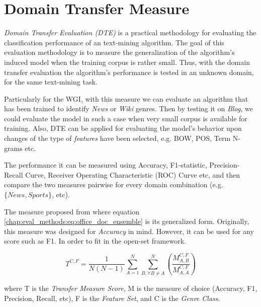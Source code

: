 \section{Domain Transfer Measure}\label{chap:eval_methods:sec:domain_transfer_measure}

\textit{Domain Transfer Evaluation (DTE)} is a practical methodology for evaluating the classification performance of an text-mining algorithm. The goal of this evaluation methodology is to measure the generalization of the algorithm's induced model when the training corpus is rather small. Thus, with the domain transfer evaluation the algorithm's performance is tested in an unknown domain, for the same text-mining task. 

Particularly for the WGI, with this measure we can evaluate an algorithm that has been trained to identify \textit{News} or \textit{Wiki} genres. Then by testing it on \textit{Blog}, we could evaluate the model in such a case when very small corpus is available for training. Also, DTE can be applied for evaluating the model's behavior upon changes of the type of \textit{features} have been selected, e.g. BOW, POS, Term N-grams etc. 

The performance it can be measured using Accuracy, F1-statistic, Precision-Recall Curve, Receiver Operating Characteristic (ROC) Curve etc, and then compare the two measures pairwise for every domain combination (e.g. $\{News, Sports\}$, etc).

The measure proposed from \parencite{finn2006learning} where equation \ref{chap:eval_methods:eq:office_doc_ensemble} is its generalized form. Originally, this measure was designed for \textit{Accuracy} in mind. However, it can be used for any score such as F1. In order to fit in the open-set framework.

\begin{equation} \label{chap:eval_methods:eq:office_doc_ensemble}
	T^{C,F} = \frac{1}{N(N-1)} \sum_{A=1}^{N} \sum_{B, \forall B \neq A}^{N} \left(  \frac{M^{C,F}_{A,B}}{M^{C,F}_{A,A}} \right)
\end{equation}

\noindent	
where T is the \textit{Transfer Measure Score}, M is the measure of choice (Accuracy, F1, Precision, Recall, etc), F is the \textit{Feature Set}, and C is the \textit{Genre Class}. 
























